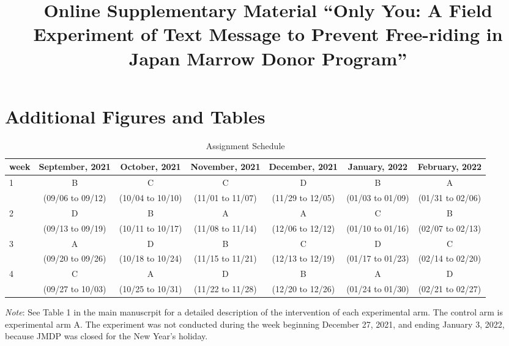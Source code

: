 \documentclass[12pt, a4paper]{article}
\title{Online Supplementary Material
``Only You: A Field Experiment of Text Message to Prevent Free-riding in Japan Marrow Donor Program''}
\author{}
\date{}
\begin{document}
\begin{spacing}{1}
  \maketitle
  \end{spacing}



\setcounter{footnote}{0}
\appendix

\setcounter{figure}{0}
\setcounter{table}{0}
\renewcommand\thefigure{\thesection\arabic{figure}}
\renewcommand{\thetable}{\thesection\arabic{table}}
\renewcommand{\theHfigure}{\thesection\arabic{figure}}
\renewcommand{\theHtable}{\thesection\arabic{table}}

\hypertarget{figtab}{%
\section{Additional Figures and Tables}\label{figtab}}

\begin{table}[H]

\caption{\label{tab:assignment}Assignment Schedule}
\centering
\fontsize{8}{10}\selectfont
\begin{threeparttable}
\begin{tabular}[t]{lcccccc}
\toprule
week & September, 2021 & October, 2021 & November, 2021 & December, 2021 & January, 2022 & February, 2022\\
\midrule
1 & B & C & C & D & B & A\\
 & (09/06 to 09/12) & (10/04 to 10/10) & (11/01 to 11/07) & (11/29 to 12/05) & (01/03 to 01/09) & (01/31 to 02/06)\\
2 & D & B & A & A & C & B\\
 & (09/13 to 09/19) & (10/11 to 10/17) & (11/08 to 11/14) & (12/06 to 12/12) & (01/10 to 01/16) & (02/07 to 02/13)\\
3 & A & D & B & C & D & C\\
 & (09/20 to 09/26) & (10/18 to 10/24) & (11/15 to 11/21) & (12/13 to 12/19) & (01/17 to 01/23) & (02/14 to 02/20)\\
4 & C & A & D & B & A & D\\
 & (09/27 to 10/03) & (10/25 to 10/31) & (11/22 to 11/28) & (12/20 to 12/26) & (01/24 to 01/30) & (02/21 to 02/27)\\
\bottomrule
\end{tabular}
\begin{tablenotes}
\item \emph{Note}: See Table 1 in the main manuscrpit for a detailed description of the intervention of each experimental arm. The control arm is experimental arm A. The experiment was not conducted during the week beginning December 27, 2021, and ending January 3, 2022, because JMDP was closed for the New Year's holiday.
\end{tablenotes}
\end{threeparttable}
\end{table}
\end{document}

